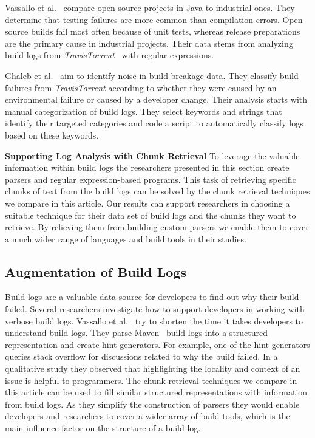 Vassallo et al.~\cite{vassallo2017a-tale} compare open source projects
in Java to industrial ones.
They determine that testing failures are
more common than compilation errors.
Open source builds fail most
often because of unit tests, whereas release preparations are the
primary cause in industrial projects.
Their data stems from analyzing
build logs from \emph{TravisTorrent}~\cite{beller2017travistorrent}
with regular expressions.

Ghaleb et al.~\cite{ghaleb2019studying} aim to identify noise in build
breakage data.
They classify build failures from \emph{TravisTorrent}
according to whether they were caused by an environmental failure or
caused by a developer change.
Their analysis starts with manual
categorization of build logs.
They select keywords and strings that
identify their targeted categories and code a script to automatically
classify logs based on these keywords.

\noindent
\textbf{Supporting Log Analysis with Chunk Retrieval}
To leverage the valuable information within build logs the researchers
presented in this section create parsers and regular expression-based
programs.
This task of retrieving specific chunks of text from the
build logs can be solved by the chunk retrieval techniques we compare
in this article.
Our results can support researchers in choosing a
suitable technique for their data set of build logs and the chunks
they want to retrieve.
By relieving them from building custom parsers
we enable them to cover a much wider range of languages and build
tools in their studies.


\subsection{Augmentation of Build Logs}
\label{sec:rw-bl-analysis}
Build logs are a valuable data source for developers to find out why
their build failed.
Several researchers investigate how to support
developers in working with verbose build logs.
Vassallo et
al.~\cite{vassallo2018un-break} try to shorten the time it takes
developers to understand build logs.
They parse
Maven~\cite{maven2019website} build logs into a structured
representation and create hint generators.
For example, one of the hint generators queries stack overflow for
discussions related to why the build failed.
In a qualitative study
they observed that highlighting the locality and context of an issue
is helpful to programmers.
The chunk retrieval techniques we compare in this article can be used
to fill similar structured representations with information from build
logs.
As they simplify the construction of parsers they would enable
developers and researchers to cover a wider array of build tools,
which is the main influence factor on the structure of a build log.

